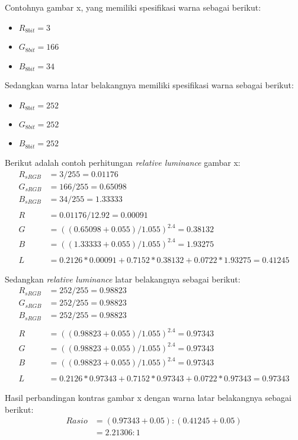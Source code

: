Contohnya gambar x, yang memiliki spesifikasi warna sebagai berikut:
\begin{itemize}
	\item $R_{8bit} = 3$
	\item $G_{8bit} = 166$
	\item $B_{8bit} = 34$
\end{itemize}

Sedangkan warna latar belakangnya memiliki spesifikasi warna sebagai berikut:
\begin{itemize}
	\item $R_{8bit} = 252$
	\item $G_{8bit} = 252$
	\item $B_{8bit} = 252$
\end{itemize}

Berikut adalah contoh perhitungan \textit{relative luminance} gambar x:
\begin{align*}
	R_{sRGB} &= 3 / 255 = 0.01176 \\
	G_{sRGB} &= 166 / 255 = 0.65098 \\
	B_{sRGB} &= 34 / 255 = 1.33333 \\
	\\
	R &= 0.01176/12.92 = 0.00091 \\
	G &= ((0.65098 + 0.055)/1.055)^{2.4} = 0.38132 \\
	B &= ((1.33333 + 0.055)/1.055)^{2.4} = 1.93275 \\
	\\
	L &= 0.2126 * 0.00091 + 0.7152 * 0.38132 + 0.0722 * 1.93275 = 0.41245
\end{align*}

Sedangkan \textit{relative luminance} latar belakangnya sebagai berikut:
\begin{align*}
	R_{sRGB} &= 252 / 255 = 0.98823 \\
	G_{sRGB} &= 252 / 255 = 0.98823 \\
	B_{sRGB} &= 252 / 255 = 0.98823 \\
	\\
	R &= ((0.98823 + 0.055)/1.055)^{2.4} = 0.97343 \\
	G &= ((0.98823 + 0.055)/1.055)^{2.4} = 0.97343 \\
	B &= ((0.98823 + 0.055)/1.055)^{2.4} = 0.97343 \\
	\\
	L &= 0.2126 * 0.97343 + 0.7152 *0.97343 + 0.0722 * 0.97343 = 0.97343
\end{align*}

Hasil perbandingan kontras gambar x dengan warna latar belakangnya sebagai berikut:
\begin{align*}
	Rasio &= (0.97343 + 0.05) : (0.41245 +0.05) \\
	&= 2.21306 : 1
\end{align*}

